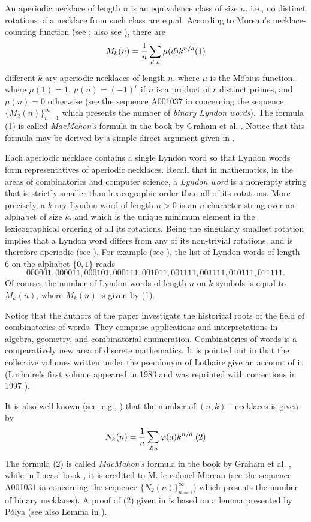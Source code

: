\documentclass[12pt]{amsart}
\begin{document}
{An aperiodic necklace of length $n$ is an equivalence class of size $n$, 
i.e., no distinct rotations of a necklace from such class are equal. 
According to Moreau's necklace-counting function (see \cite[p. 503]{lu}; also 
see \cite{ri}), 
there are 
     $$
M_k(n)=\frac{1}{n}\sum_{d\mid n}\mu(d)k^{n/d}\relax(1)
  $$
different $k$-ary aperiodic necklaces  of length $n$, where $\mu$ is the 
M\"{o}bius function, where $\mu(1)=1$, $\mu(n)=(-1)^r$ if $n$ is a product 
of $r$ distinct primes, and $\mu(n)=0$ otherwise (see the sequence 
A001037 in   \cite{oe} concerning the sequence 
$\{M_2(n)\}_{n=1}^{\infty}$ which presents the number of {\it binary Lyndon 
words}). 
 The formula (1) is called  
 {\it MacMahon's} formula in the book by Graham et al. \cite[the formula 
(4.63), p. 141]{gr}.
Notice that this formula may be derived by a simple 
direct argument given in \cite{ggw}.  


Each aperiodic necklace contains a single Lyndon word so that Lyndon words 
form representatives of aperiodic necklaces. Recall that in mathematics, in 
the areas of combinatorics and computer science, a {\it Lyndon word} is a 
nonempty string 
that is strictly smaller than lexicographic order than all of its rotations.
More precisely, a $k$-ary Lyndon word of length $n>0$ is an $n$-character 
string over an alphabet of size $k$, and which is the unique minimum element 
in the lexicographical ordering of all its rotations. 
Being the singularly smallest rotation implies that a Lyndon word 
differs from any of its non-trivial rotations, and is therefore aperiodic 
(see \cite{bp}). For example (see \cite{bp}), the list of Lyndon words 
of length 6 on the alphabet $\{0,1\}$ reads
 $$
000001, 000011, 000101, 000111, 001011, 001111, 001111, 010111, 011111.
$$  
Of course, the number of Lyndon words of length $n$ on $k$ symbols
is equal to $M_k(n)$, where $M_k(n)$ is given by  (1). 

Notice that the authors of the paper \cite{bp} investigate the
historical roots of the field of combinatorics of words.  They comprise 
applications and interpretations in algebra, geometry, and combinatorial 
enumeration. Combinatorics of words is a comparatively new area of discrete
mathematics. It is pointed out in \cite{bp} that the collective volumes 
written under the pseudonym of Lothaire give an account of it 
(Lothaire's first volume \cite{lo1} appeared in 1983 and was reprinted 
with corrections in 1997 \cite{lo2}).  
 
It is also well known (see, e.g., \cite[p. 162]{ri}) that the number of 
$(n,k)$ -  necklaces is given by 
 $$
N_k(n)=\frac{1}{n}\sum_{d\mid n}\varphi(d)k^{n/d}.\relax(2)
  $$
The formula (2) is called  
 {\it MacMahon's} formula in the book by Graham et al. 
\cite[the formula (4.63), p. 141]{gr}, while in 
Lucas' book \cite[p. 503]{lu}, it is credited to M. le 
colonel Moreau (see the sequence 
A001031 in   \cite{oe} concerning the sequence 
 $\{N_2(n)\}_{n=1}^{\infty}$) which presents the number of binary necklaces). 
A proof of 
(2) given in \cite[pp. 14-141]{gr} is based on a lemma 
presented by P\'{o}lya \cite{po} (see also Lemma in \cite[p. 659]{ri}). 

}
\end{document}
